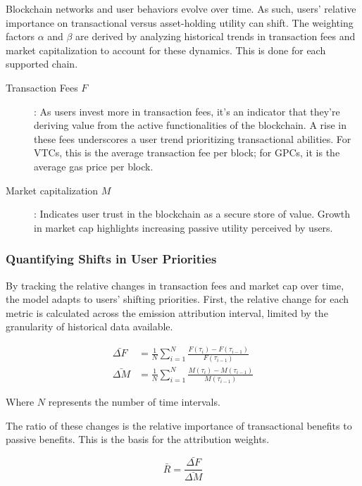\documentclass[11pt]{report}
\begin{document}
Blockchain networks and user behaviors evolve over time. As such, users' relative importance on transactional versus asset-holding utility can shift. The weighting factors $\alpha$ and $\beta$ are derived by analyzing historical trends in transaction fees and market capitalization to account for these dynamics. This is done for each supported chain.

\begin{description}
    \item[Transaction Fees $F$]: As users invest more in transaction fees, it's an indicator that they're deriving value from the active functionalities of the blockchain. A rise in these fees underscores a user trend prioritizing transactional abilities. For \ac{VTC}s, this is the average transaction fee per block; for \ac{GPC}s, it is the average gas price per block.
    \item[Market capitalization $M$]: Indicates user trust in the blockchain as a secure store of value. Growth in market cap highlights increasing passive utility perceived by users.
\end{description}

\subsubsection{Quantifying Shifts in User Priorities}

By tracking the relative changes in transaction fees and market cap over time, the model adapts to users' shifting priorities. First, the relative change for each metric is calculated across the emission attribution interval, limited by the granularity of historical data available.

\begin{align}
    \bar{\Delta F} & = \frac{1}{N}\sum_{i=1}^{N}\frac{F(\tau_i) - F(\tau_{i-1})}{F(\tau_{i-1})} \\
    \bar{\Delta M} & = \frac{1}{N}\sum_{i=1}^{N}\frac{M(\tau_i) - M(\tau_{i-1})}{M(\tau_{i-1})}
\end{align}



Where \( N \) represents the number of time intervals.

The ratio of these changes is the relative importance of transactional benefits to passive benefits. This is the basis for the attribution weights.

\begin{equation} \label{eq:weights_ratio}
    \bar{R} = \frac{\bar{\Delta F}}{\bar{\Delta M}}
\end{equation}
\end{document}
